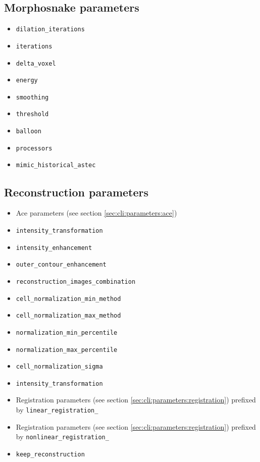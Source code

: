 \subsection{Morphosnake parameters}
\label{sec:cli:parameters:morphosnake}

\begin{itemize}
\itemsep -0.5ex
\item \texttt{dilation\_iterations}
\item \texttt{iterations}
\item \texttt{delta\_voxel}
\item \texttt{energy}
\item \texttt{smoothing}
\item \texttt{threshold}
\item \texttt{balloon}
\item \texttt{processors}
\item \texttt{mimic\_historical\_astec}
\end{itemize}


\subsection{Reconstruction parameters}
\label{sec:cli:parameters:reconstruction}

\begin{itemize}
\itemsep -0.5ex
\item Ace parameters
  (see section \ref{sec:cli:parameters:ace})
\item \texttt{intensity\_transformation}
\item \texttt{intensity\_enhancement}
\item \texttt{outer\_contour\_enhancement}
\item \texttt{reconstruction\_images\_combination}
\item \texttt{cell\_normalization\_min\_method}
\item \texttt{cell\_normalization\_max\_method}
\item \texttt{normalization\_min\_percentile}
\item \texttt{normalization\_max\_percentile}
\item \texttt{cell\_normalization\_sigma}
\item \texttt{intensity\_transformation}
\item Registration parameters 
  (see section \ref{sec:cli:parameters:registration}) prefixed 
  by \texttt{linear\_registration\_}
\item Registration parameters 
  (see section \ref{sec:cli:parameters:registration}) prefixed 
  by \texttt{nonlinear\_registration\_}
\item \texttt{keep\_reconstruction}
\end{itemize}


